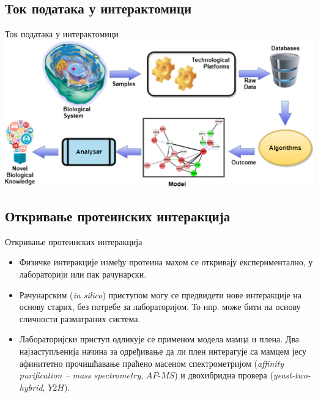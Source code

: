 \documentclass[hyperref={bookmarks=false}]{beamer}
\begin{document}
\subsection{Ток података у интерактомици}
\begin{frame}{Ток података у интерактомици}
\centering\includegraphics[width=.95\textwidth]{model.png}
\end{frame}

\subsection{Откривање протеинских интеракција}
\begin{frame}{Откривање протеинских интеракција}
\begin{itemize}
	\item Физичке интеракције између протеина махом се откривају експериментално, у лабораторији или пак рачунарски.

	\item Рачунарским (\textit{in silico}) приступом могу се предвидети нове интеракције на основу старих, без потребе за лабораторијом. То нпр. може бити на основу сличности разматраних система.

	\item Лабораторијски приступ одликује се применом модела мамца и плена. Два најзаступљенија начина за одређивање да ли плен интерагује са мамцем јесу афинитетно прочишћавање праћено масеном спектрометријом (\textit{affinity purification -- mass spectrometry}, $AP$-$MS$) и двохибридна провера (\textit{yeast-two-hybrid}, $Y2H$).
\end{itemize}
\end{frame}
\end{document}
